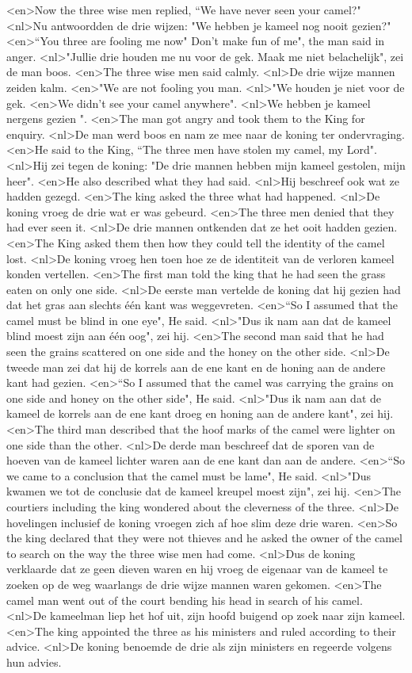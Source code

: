 <en>Now the three wise men replied, “We have never seen your camel?"
<nl>Nu antwoordden de drie wijzen: "We hebben je kameel nog nooit gezien?"
<en>“You three are fooling me now" Don’t make fun of me", the man said in anger.
<nl>"Jullie drie houden me nu voor de gek. Maak me  niet belachelijk", zei de man boos.
<en>The three wise men said calmly.
<nl>De drie wijze mannen zeiden kalm. 
<en>"We are not fooling you man.
<nl>"We houden je niet voor de gek.
<en>We didn’t see your camel anywhere".
<nl>We hebben je kameel nergens gezien ".
<en>The man got angry and took them to the King for enquiry.
<nl>De man werd boos en nam ze mee naar de koning ter ondervraging.
<en>He said to the King, “The three men have stolen my camel, my Lord".
<nl>Hij zei tegen de koning: "De drie mannen hebben mijn kameel gestolen, mijn heer".
<en>He also described what they had said.
<nl>Hij beschreef ook wat ze hadden gezegd.
<en>The king asked the three what had happened.
<nl>De koning vroeg de drie wat er was gebeurd.
<en>The three men denied that they had ever seen it.
<nl>De drie mannen ontkenden dat ze het ooit hadden gezien.
<en>The King asked them then how they could tell the identity of the camel lost.
<nl>De koning vroeg hen toen hoe ze de identiteit van de verloren kameel konden vertellen.
<en>The first man told the king that he had seen the grass eaten on only one side.
<nl>De eerste man vertelde de koning dat hij gezien had dat het gras aan slechts één kant was weggevreten.
<en>“So I assumed that the camel must be blind in one eye", He said.
<nl>"Dus ik nam aan dat de kameel blind moest zijn aan één oog", zei hij.
<en>The second man said that he had seen the grains scattered on one side and the honey on the other side.
<nl>De tweede man zei dat hij de korrels aan de ene kant en de honing aan de andere kant had gezien.
<en>“So I assumed that the camel was carrying the grains on one side and honey on the other side", He said.
<nl>"Dus ik nam aan dat de kameel de korrels aan de ene kant droeg en honing aan de andere kant", zei hij.
<en>The third man described that the hoof marks of the camel were lighter on one side than the other.
<nl>De derde man beschreef dat de sporen van de hoeven van de kameel lichter waren aan de ene kant dan aan de andere.
<en>“So we came to a conclusion that the camel must be lame", He said.
<nl>"Dus kwamen we tot de conclusie dat de kameel kreupel moest zijn", zei hij.
<en>The courtiers including the king wondered about the cleverness of the three.
<nl>De hovelingen inclusief de koning vroegen zich af hoe slim deze drie waren.
<en>So the king declared that they were not thieves and he asked the owner of the camel to search on the way the three wise men had come.
<nl>Dus de koning verklaarde dat ze geen dieven waren en hij vroeg de eigenaar van de kameel te zoeken op de weg  waarlangs de drie wijze mannen waren gekomen.
<en>The camel man went out of the court bending his head in search of his camel.
<nl>De kameelman liep het hof uit,  zijn hoofd buigend op zoek naar zijn kameel.
<en>The king appointed the three as his ministers and ruled according to their advice.
<nl>De koning benoemde de drie als zijn ministers en regeerde volgens hun advies.
